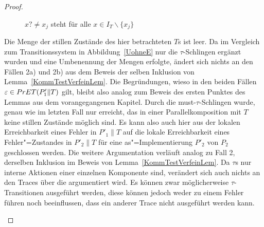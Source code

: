 \begin{proof}
\begin{itemize}
\begin{figure} [h!tbp]
\begin{center}
        \caption{$x?\neq x_j$ steht für alle $x\in I_T\backslash\{x_j\}$}
      \label{TohneEmitTau}
      \end{center}
      \end{figure}
      Die Menge der stillen Zustände des hier betrachteten $T$s ist leer. Da im
      Vergleich zum Transitionssystem in Abbildung~\ref{UohneE} nur die
      $\tau$-Schlingen ergänzt wurden und eine Umbenennung der Mengen erfolgte,
      ändert sich nichts an den Fällen 2a) und 2b) aus dem Beweis der selben
      Inklusion von Lemma~\ref{KommTestVerfeinLem}. Die Begründungen, wieso in
      den beiden Fällen $\varepsilon\in PrET (P'_1\|T)$ gilt, bleibt also
      analog zum Beweis des ersten Punktes des Lemmas aus dem vorangegangenen
      Kapitel. Durch die must-$\tau$-Schlingen wurde, genau wie im letzten Fall
      nur erreicht, das in einer Parallelkomposition mit $T$ keine stillen
      Zustände möglich sind. Es kann also auch hier aus der lokalen
      Erreichbarkeit eines Fehler in $P'_1\|T$ auf die lokale Erreichbarkeit
      eines Fehler"=Zustandes in $P'_2\|T$ für eine as"=Implementierung $P'_2$
      von $P_2$ geschlossen werden. Die weitere Argumentation verläuft analog
      zu Fall 2, derselben Inklusion im Beweis von
      Lemma~\ref{KommTestVerfeinLem}. Da $\tau$s nur interne Aktionen einer
      einzelnen Komponente sind, verändert sich auch nichts an den Traces über
      die argumentiert wird. Es können zwar möglicherweise $\tau$-Transitionen
      ausgeführt werden, diese können jedoch weder zu einem Fehler führen noch
      beeinflussen, dass ein anderer Trace nicht ausgeführt werden kann.
  \end{itemize}


\end{proof}

